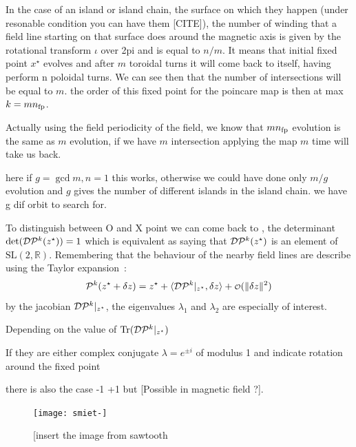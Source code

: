 In the case of an island or island chain, the surface on which they happen (under resonable condition you can have them [CITE]), the number of winding that a field line starting on that surface does around the magnetic axis is given by the rotational transform $\iota$ over 2pi and is equal to $n/m$. It means that initial fixed point $x^\star$ evolves and after $m$ toroidal turns it will come back to itself, having perform n poloidal turns. We can see then that the number of intersections will be equal to $m$. the order of this fixed point for the poincare map is then at max $k=mn_\text{fp}$.

\begin{figure}[H]
    \hfill
    \caption{}
\end{figure}

Actually using the field periodicity of the field, we know that $mn_\text{fp}$ evolution is the same as $m$ evolution, if we have $m$ intersection applying the map $m$ time will take us back.

here if $g = \gcd{m,n} = 1$ this works, otherwise we could have done only $m/g$ evolution and $g$ gives the number of different islands in the island chain.
we have g dif orbit to search for.

To distinguish between O and X point we can come back to , the determinant $\text{det}(\mathcal{D}\mathcal{P}^k(z^\star)) = 1$ which is equivalent as saying that $\mathcal{D}\mathcal{P}^k(z^\star)$ is an element of $\text{SL}(2,\mathbb{R})$. Remembering that the behaviour of the nearby field lines are describe using the Taylor expansion~:
\begin{equation*}
    \pmap^k(\z^\star+\delta \z) = \z^\star + \langle\dpmap^k\vert_{\z^\star}, \delta\z\rangle + \smallO(\Vert\delta\z\Vert^2)
\end{equation*}
by the jacobian $\mathcal{D}\mathcal{P}^k\vert_{z^\star}$, the eigenvalues $\lambda_1$ and $\lambda_2$ are especially of interest.

Depending on the value of $\text{Tr}(\mathcal{D}\mathcal{P}^k\vert_{z^\star})$

If they are either complex conjugate $\lambda = e^{\pm i}$ of modulus 1 and indicate rotation around the fixed point


there is also the case -1 +1 but 
[Possible in magnetic field ?].

\begin{figure}[H]
    \centering
    \texttt{[image: smiet-]}
    \caption{[insert the image from sawtooth}
    \label{fig:enter-label}
\end{figure}

